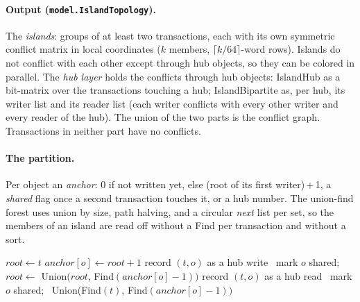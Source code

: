 \documentclass[10pt,a4paper]{article}
\newcommand{\W}{\mathit{W}}
\newcommand{\R}{\mathit{R}}
\begin{document}
\paragraph{Output (\texttt{model.IslandTopology}).} The \emph{islands}: groups of at least two
transactions, each with its own symmetric conflict matrix in local coordinates ($k$ members,
$\lceil k/64\rceil$-word rows). Islands do not conflict with each other except through hub
objects, so they can be colored in parallel. The \emph{hub layer} holds the conflicts through hub
objects: IslandHub as a bit-matrix over the transactions touching a hub; IslandBipartite as, per
hub, its writer list and its reader list (each writer conflicts with every other writer and every
reader of the hub). The union of the two parts is the conflict graph. Transactions in neither part
have no conflicts.

\paragraph{The partition.} Per object an \emph{anchor}: 0 if not written yet, else (root of its
first writer)\,+\,1, a \emph{shared} flag once a second transaction touches it, or a hub number.
The union-find forest uses union by size, path halving, and a circular \emph{next} list per set, so
the members of an island are read off without a Find per transaction and without a sort.

\begin{algorithm}[H]
\caption{Partition$(T, \text{hubs})$}
\begin{algorithmic}[1]
 
  \State $root \gets t$
  \For{$o\in\W(t)$}
     $anchor[o]\gets root+1$ 
     record $(t, o)$ as a hub write 
    \Else\ mark $o$ shared; \ $root \gets$ Union$(root$, Find$(anchor[o]-1))$
    \EndIf
  \EndFor
\EndFor
{} 
  \For{$o\in\R(t)$ with $anchor[o]\neq 0$} 
     record $(t,o)$ as a hub read
    \Else\ mark $o$ shared; \ Union(Find$(t)$, Find$(anchor[o]-1))$ 
    \EndIf
  \EndFor
\EndFor
\end{algorithmic}
\end{algorithm}
\end{document}
